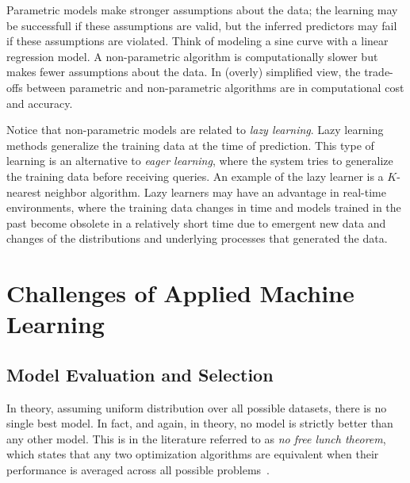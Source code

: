 \begin{refsection}
Parametric models make stronger assumptions about the data; the learning may be successfull if these assumptions are valid, but the inferred predictors may fail if these assumptions are violated. Think of modeling a sine curve with a linear regression model. A non-parametric algorithm is computationally slower but makes fewer assumptions about the data. In (overly) simplified view, the trade-offs between parametric and non-parametric algorithms are in computational cost and accuracy.

Notice that non-parametric models are related to {\em lazy learning}. Lazy learning methods generalize the training data at the time of prediction. This type of learning is an alternative to {\em eager learning}, where the system tries to generalize the training data before receiving queries. An example of the lazy learner is a $K$-nearest neighbor algorithm. Lazy learners may have an advantage in real-time environments, where the training data changes in time and models trained in the past become obsolete in a relatively short time due to emergent new data and changes of the distributions and underlying processes that generated the data.


\section{Challenges of Applied Machine Learning}

\subsection*{Model Evaluation and Selection}

In theory, assuming uniform distribution over all possible datasets, there is no single best model. In fact, and again, in theory, no model is strictly better than any other model. This is in the literature referred to as {\em no free lunch theorem}, which states that any two optimization algorithms are equivalent when their performance is averaged across all possible problems~\cite{2005-Wolpert-Macready}. 


\end{refsection}
